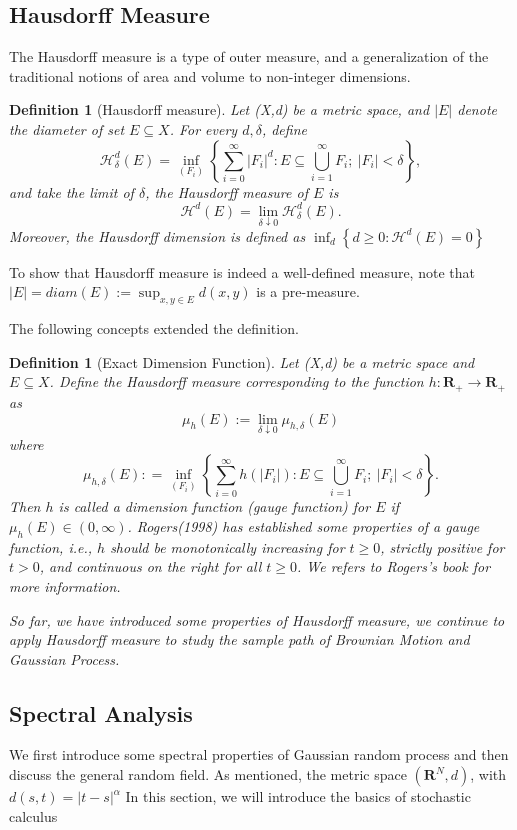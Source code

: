\documentclass[11pt,english]{smfart}
\newtheorem{definition}[theorem]{Definition}
\newcommand{\mf}{\mathbf}
\begin{document}
\subsection{Hausdorff Measure}
The Hausdorff measure is a type of outer measure, and a generalization of the traditional notions of area and volume to non-integer dimensions.\\

\begin{definition}[Hausdorff measure]
    Let (X,d) be a metric space, and $|E|$ denote the diameter of set $E\subseteq X$. For every $d,\delta$, define $$\mathcal{H}_\delta^d (E)= \inf_{(F_i)} \left\{ \sum_{i=0}^\infty |F_i|^d : E\subseteq \bigcup_{i=1}^\infty F_i ;\ |F_i| < \delta  \right\},$$ and take the limit of $\delta$, the Hausdorff measure of $E$ is $$\mathcal{H}^d(E) = \lim_{\delta\downarrow 0} \mathcal{H}^d_\delta (E).$$ Moreover, the Hausdorff dimension is defined as $\displaystyle{\inf_{d}\left\{d\geq 0: \mathcal{H}^d(E) = 0\right\}}$
\end{definition}

To show that Hausdorff measure is indeed a well-defined measure, note that $\displaystyle{|E| = diam(E) := \sup_{x,y\in E}d(x,y)}$ is a pre-measure.

The following concepts extended the definition. \\

\begin{definition}[Exact Dimension Function]
    Let (X,d) be a metric space and $E \subseteq X$. Define the Hausdorff measure corresponding to the function $h:\mf{R}_+ \rightarrow \mf{R}_+$ as $$\mu _h(E) := \lim_{\delta \downarrow 0} \mu_{h,\delta}(E)$$ where 
    $$\mu_{h,\delta}(E) : = \inf_{(F_i)} \left\{ \sum_{i=0}^\infty h(|F_i|) : E\subseteq \bigcup_{i=1}^\infty F_i ;\ |F_i| < \delta  \right\}.$$ Then $h$ is called a dimension function (gauge function) for $E$ if $\mu_h(E) \in (0,\infty)$. Rogers(1998) has established some properties of a gauge function, i.e., $h$ should be monotonically increasing for $t\geq 0$, strictly positive for $t>0$, and continuous on the right for all $t\geq 0$. We refers to Rogers's book \cite{Rogers} for more information.

    So far, we have introduced some properties of Hausdorff measure, we continue to apply Hausdorff measure to study the sample path of Brownian Motion and Gaussian Process.
\end{definition}

\subsection{Spectral Analysis}
We first introduce some spectral properties of Gaussian random process and then discuss the general random field. As mentioned, the metric space $\left(\mf{R}^N,d\right)$, with $d(s,t) = |t-s|^\alpha$
In this section, we will introduce the basics of stochastic calculus
\end{document}
